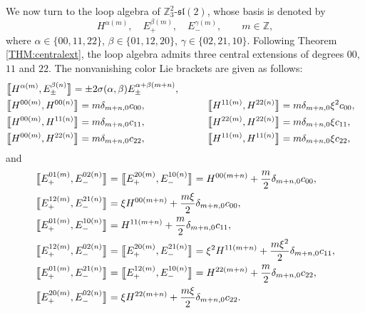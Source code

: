 \documentclass[pdftex]{sigma}
\numberwithin{equation}{section}
\theoremstyle{definition}
\def\sl{\mathfrak{sl}}
\def\Zsl{$\mathbb{Z}_3^2$-$\sl(2)$}
\begin{document}
We now turn to the loop algebra of \Zsl, whose basis is denoted by
\begin{equation*}
	H^{\alpha (m)}, \quad E_+^{\beta (m)}, \quad E_-^{\gamma (m)}, \qquad m \in \mathbb{Z},
\end{equation*}
where $\alpha \in \{ 00, 11, 22 \}$, $\beta \in \{ 01, 12, 20 \}$, $\gamma \in \{ 02, 21, 10 \} $.
Following Theorem \ref{THM:centralext}, the loop algebra admits three central extensions of degrees $00$, $11$ and $22$.
The nonvanishing color Lie brackets are given as follows:
\begin{alignat*}{3}
	&\bigl\llbracket H^{\alpha (m)}, E_{\pm}^{\beta (n)} \bigr\rrbracket= \pm 2\sigma(\alpha,\beta) E_{\pm}^{\alpha+\beta (m+n)},
	\qquad &&& \notag \\
	&\bigl\llbracket H^{00 (m)}, H^{00 (n)} \bigr\rrbracket= m \delta_{m+n,0} c_{00}, \qquad&&
	\bigl\llbracket H^{11 (m)}, H^{22 (n)} \bigr\rrbracket= m \delta_{m+n,0} \xi^2 c_{00},&
	\notag \\
	&\bigl\llbracket H^{00 (m)}, H^{11 (n)} \bigr\rrbracket= m \delta_{m+n,0} c_{11},
	\qquad &&
	\bigl\llbracket H^{22 (m)}, H^{22 (n)} \bigr\rrbracket= m \delta_{m+n,0} \xi c_{11},&
	\notag \\
	&\bigl\llbracket H^{00 (m)}, H^{22 (n)} \bigr\rrbracket= m \delta_{m+n,0} c_{22},\qquad
	&&
	\bigl\llbracket H^{11 (m)}, H^{11 (n)} \bigr\rrbracket= m \delta_{m+n,0} \xi c_{22},&
\end{alignat*}
and
\begin{align*}
	&\bigl\llbracket E_{+}^{01 (m)}, E_{-}^{02 (n)} \bigr\rrbracket= \bigl\llbracket E_+^{20 (m)}, E_-^{10 (n)} \bigr\rrbracket = H^{00 (m+n)} + \frac{m}{2} \delta_{m+n,0} c_{00},
	\notag \\
	&\bigl\llbracket E_{+}^{12 (m)}, E_{-}^{21 (n)} \bigr\rrbracket= \xi H^{00 (m+n)} + \frac{m \xi}{2} \delta_{m+n,0} c_{00},
	\notag \\
	&\bigl\llbracket E_{+}^{01 (m)}, E_{-}^{10 (n)} \bigr\rrbracket= H^{11 (m+n)} + \frac{m}{2} \delta_{m+n,0} c_{11},
	\notag \\
	&\bigl\llbracket E_{+}^{12 (m)}, E_{-}^{02 (n)} \bigr\rrbracket=\bigl\llbracket E_{+}^{20 (m)}, E_{-}^{21 (n)} \bigr\rrbracket = \xi^2 H^{11 (m+n)} + \frac{m\xi^2}{2} \delta_{m+n,0}c_{11},
	\notag \\
	&\bigl\llbracket E_{+}^{01 (m)}, E_{-}^{21 (n)} \bigr\rrbracket= \bigl\llbracket E_{+}^{12 (m)}, E_{-}^{10 (n)} \bigr\rrbracket = H^{22 (m+n)} + \frac{m}{2} \delta_{m+n,0}c_{22},
	\notag \\
	&\bigl\llbracket E_{+}^{20 (m)}, E_{-}^{02 (n)} \bigr\rrbracket= \xi H^{22 (m+n)} + \frac{m\xi}{2} \delta_{m+n,0}c_{22}.
\end{align*}
\end{document}
